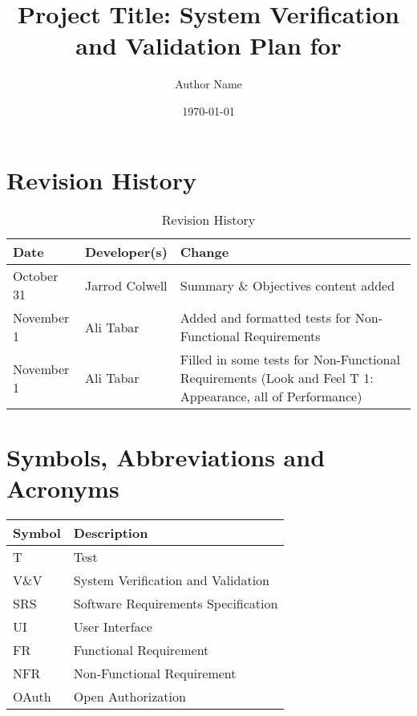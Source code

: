 \documentclass[12pt, titlepage]{article}
\begin{document}
\title{Project Title: System Verification and Validation Plan for \progname{}} 
\author{Author Name}
\date{\today}
	
\maketitle


\section*{Revision History}
\begin{table}[hp]
	\caption{Revision History} \label{TblRevisionHistory}
	\begin{tabularx}{\textwidth}{llX}
		\toprule
		\textbf{Date} & \textbf{Developer(s)} & \textbf{Change}\\
		\midrule
		October 31 & Jarrod Colwell & Summary \& Objectives content added\\
		\midrule
		November 1 & Ali Tabar & Added and formatted tests for Non-Functional Requirements\\
		\midrule
		November 1 & Ali Tabar & Filled in some tests for Non-Functional Requirements (Look and Feel T 1: Appearance, all of Performance)\\
		\bottomrule
	\end{tabularx}
\end{table}
\newpage

\tableofcontents

\listoftables
{}

\listoffigures
{}

\newpage

\section{Symbols, Abbreviations and Acronyms}

\renewcommand{\arraystretch}{1.2}
\begin{tabular}{l | l} 
  \toprule		
  \textbf{Symbol} & \textbf{Description}\\
  \midrule 
  T & Test\\
  V\&V & System Verification and Validation\\
  SRS & Software Requirements Specification\\
  UI & User Interface\\
  FR & Functional Requirement\\
  NFR & Non-Functional Requirement\\
  OAuth & Open Authorization\\
  \bottomrule
\end{tabular}\\
\end{document}
